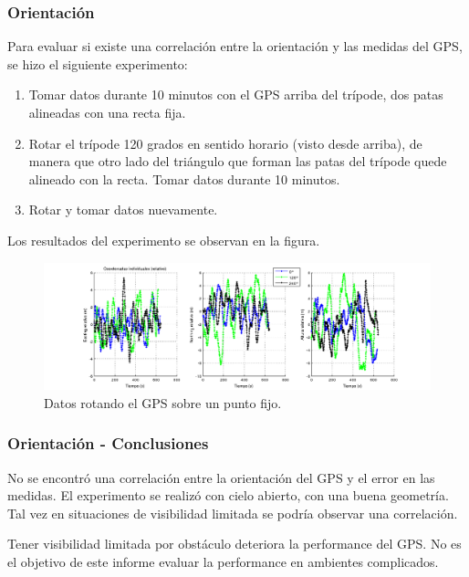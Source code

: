 \documentclass[spanish,12pt,a4paper,titlepage]{report}
\begin{document}
\newpage
\subsubsection{Orientación}
\label{sec:gps-orientacion}

Para evaluar si existe una correlación entre la orientación y las medidas del GPS, se hizo el siguiente experimento:
\begin{enumerate}
\item Tomar datos durante 10 minutos con el GPS arriba del trípode, dos patas alineadas con una recta fija.
\item Rotar el trípode 120 grados en sentido horario (visto desde arriba), de manera que otro lado del triángulo que forman las patas del trípode quede alineado con la recta. Tomar datos durante 10 minutos.
\item Rotar y tomar datos nuevamente.
\end{enumerate}

Los resultados del experimento se observan en la figura.

\begin{figure}[h!]
\hspace{-70pt}
  \includegraphics[width=1.4\textwidth]{./img/orientacion_individual.png}
  \caption{Datos rotando el GPS sobre un punto fijo.}
  \label{fig:orientacion_individual.png}
\end{figure}

\subsubsection{Orientación - Conclusiones}
\label{sec:orientacion-conclusiones}

No se encontró una correlación entre la orientación del GPS y el error en las medidas.
El experimento se realizó con cielo abierto, con una buena geometría. Tal vez en situaciones de visibilidad limitada se podría observar una correlación.

Tener visibilidad limitada por obstáculo deteriora la performance del GPS. No es el objetivo de este informe evaluar la performance en ambientes complicados.
\end{document}
